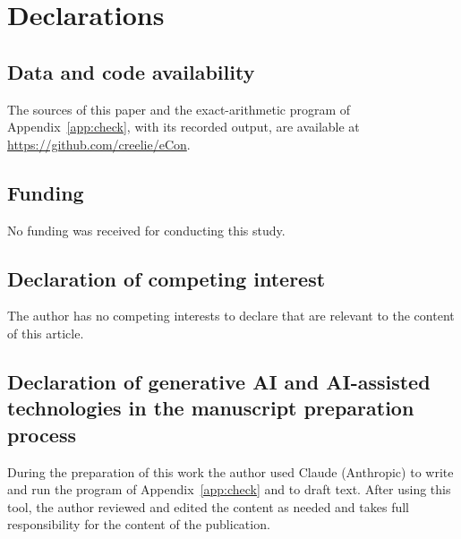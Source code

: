 \section*{Declarations}

\subsection*{Data and code availability}
The sources of this paper and the exact-arithmetic program of
Appendix~\ref{app:check}, with its recorded output, are available at
\url{https://github.com/creelie/eCon}\releaseline.

\subsection*{Funding}
No funding was received for conducting this study.

\subsection*{Declaration of competing interest}
The author has no competing interests to declare that are relevant to the
content of this article.

\subsection*{Declaration of generative AI and AI-assisted technologies in the manuscript preparation process}
During the preparation of this work the author used Claude (Anthropic) to
write and run the program of Appendix~\ref{app:check} and to draft text.
After using this tool, the author reviewed and edited the content as needed and
takes full responsibility for the content of the publication.
